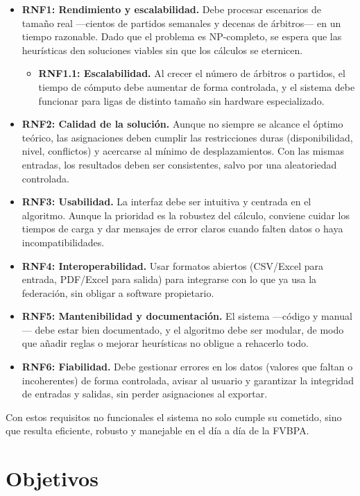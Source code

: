 \documentclass[11pt,a4paper,spanish]{book}
\numberwithin{equation}{chapter}
\numberwithin{figure}{chapter}
\numberwithin{table}{chapter}
\begin{document}
\begin{itemize}
\item {\bf RNF1: Rendimiento y escalabilidad.} Debe procesar escenarios de tamaño real —cientos de partidos semanales y decenas de árbitros— en un tiempo razonable. Dado que el problema es NP-completo, se espera que las heurísticas den soluciones viables sin que los cálculos se eternicen.
    \begin{itemize}
    \item {\bf RNF1.1: Escalabilidad.} Al crecer el número de árbitros o partidos, el tiempo de cómputo debe aumentar de forma controlada, y el sistema debe funcionar para ligas de distinto tamaño sin hardware especializado.
    \end{itemize}
\item {\bf RNF2: Calidad de la solución.} Aunque no siempre se alcance el óptimo teórico, las asignaciones deben cumplir las restricciones duras (disponibilidad, nivel, conflictos) y acercarse al mínimo de desplazamientos. Con las mismas entradas, los resultados deben ser consistentes, salvo por una aleatoriedad controlada.
\item {\bf RNF3: Usabilidad.} La interfaz debe ser intuitiva y centrada en el algoritmo. Aunque la prioridad es la robustez del cálculo, conviene cuidar los tiempos de carga y dar mensajes de error claros cuando falten datos o haya incompatibilidades.
\item {\bf RNF4: Interoperabilidad.} Usar formatos abiertos (CSV/Excel para entrada, PDF/Excel para salida) para integrarse con lo que ya usa la federación, sin obligar a software propietario.
\item {\bf RNF5: Mantenibilidad y documentación.} El sistema —código y manual— debe estar bien documentado, y el algoritmo debe ser modular, de modo que añadir reglas o mejorar heurísticas no obligue a rehacerlo todo.
\item {\bf RNF6: Fiabilidad.} Debe gestionar errores en los datos (valores que faltan o incoherentes) de forma controlada, avisar al usuario y garantizar la integridad de entradas y salidas, sin perder asignaciones al exportar.
\end{itemize}

Con estos requisitos no funcionales el sistema no solo cumple su cometido, sino que resulta eficiente, robusto y manejable en el día a día de la FVBPA.

\chapter{Objetivos}
\end{document}
